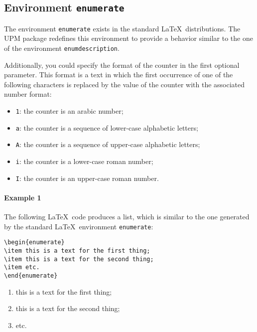 \documentclass[book,taskpackage,specpackage,codepackage]{upmethodology-document}
\begin{document}
\subsection{Environment \texttt{enumerate}}

The environment \texttt{enumerate} exists in the standard \LaTeX\ distributions.
The UPM package redefines this environment to provide a behavior similar to the one of the environment \texttt{enumdescription}.

Additionally, you could specify the format of the counter in the first optional parameter. This format is a text in which the first occurrence of one of the following characters is replaced by the value of the counter with the associated number format:
\begin{itemize}
\item \texttt{1}: the counter is an arabic number;
\item \texttt{a}: the counter is a sequence of lower-case alphabetic letters;
\item \texttt{A}: the counter is a sequence of upper-case alphabetic letters;
\item \texttt{i}: the counter is a lower-case roman number;
\item \texttt{I}: the counter is an upper-case roman number.
\end{itemize}

\paragraph{Example 1} The following \LaTeX~code produces a list, which is similar to the one generated by the standard \LaTeX\ environment \texttt{enumerate}:
\begin{verbatim}
\begin{enumerate}
\item this is a text for the first thing;
\item this is a text for the second thing;
\item etc.
\end{enumerate}
\end{verbatim}

\begin{enumerate}
\item this is a text for the first thing;
\item this is a text for the second thing;
\item etc.
\end{enumerate}
\end{document}
